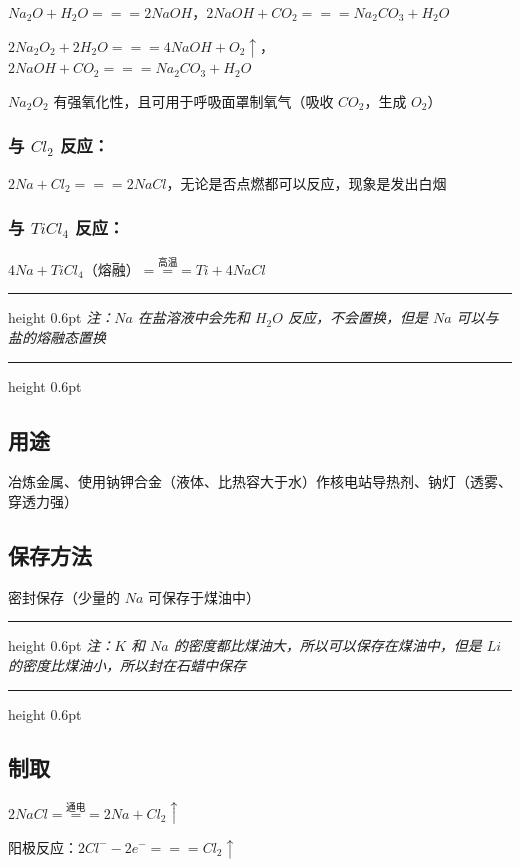 \documentclass[UTF8,zihao=-4,openany]{ctexbook}
\newenvironment{notebox}
  {\par\smallskip\noindent\begingroup\begin{minipage}{\linewidth}\color{noteframe}\hrule height 0.6pt\smallskip\color{black}\itshape}
  {\par\smallskip\color{noteframe}\hrule height 0.6pt\end{minipage}\endgroup\par\smallskip}
\begin{document}
$Na_2O+H_2O=\!=\!=2NaOH$，$2NaOH+CO_2=\!=\!=Na_2CO_3+H_2O$\par

$2Na_2O_2+2H_2O=\!=\!=4NaOH+O_2\uparrow$，\\[0.25em]
\hspace*{2em}$2NaOH+CO_2=\!=\!=Na_2CO_3+H_2O$\par

$Na_2O_2$ 有强氧化性，且可用于呼吸面罩制氧气（吸收 $CO_2$，生成 $O_2$）\par
\subsubsection{与 $Cl_2$ 反应：}
$2Na+Cl_2=\!=\!=2NaCl$，无论是否点燃都可以反应，现象是发出白烟\par
\subsubsection{与 $TiCl_4$ 反应：}
$4Na+TiCl_4$（熔融）$\stackrel{\mbox{高温}}{=\!=\!=}Ti+4NaCl$\par

\begin{notebox}
注：$Na$ 在盐溶液中会先和 $H_2O$ 反应，不会置换，但是 $Na$ 可以与盐的熔融态置换\par
\end{notebox}
\subsection{用途}
冶炼金属、使用钠钾合金（液体、比热容大于水）作核电站导热剂、钠灯（透雾、穿透力强）\par
\subsection{保存方法}
密封保存（少量的 $Na$ 可保存于煤油中）\par
\begin{notebox}
注：$K$ 和 $Na$ 的密度都比煤油大，所以可以保存在煤油中，但是 $Li$ 的密度比煤油小，所以封在石蜡中保存\par
\end{notebox}
\subsection{制取}
$2NaCl\stackrel{\mbox{通电}}{=\!=\!=}2Na+Cl_2\uparrow$\par

阳极反应：$2Cl^--2e^-=\!=\!=Cl_2\uparrow$\par
\end{document}
